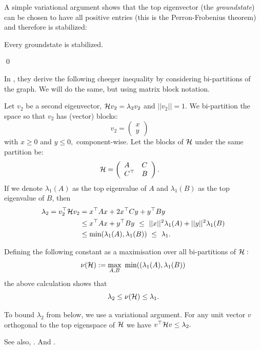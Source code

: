 \documentclass[12pt,notitlepage,longbibliography,nofootinbib,tightenlines]{revtex4}
\begin{document}
A simple variational argument
shows that the top eigenvector (the {\it groundstate})
can be chosen to have all positive entries
(this is the Perron-Frobenius theorem)
and therefore is stabilized:

Every groundstate is stabilized.

\qed


In \cite{Friedland2002}, they derive the following cheeger inequality
by considering bi-partitions of the graph. We will do the
same, but using matrix block notation.

Let $v_2$ be a second eigenvector, $ \mathcal{H} v_2 = \lambda_2 v_2 $ 
and $||v_2||=1$.
We bi-partition the space 
so that $v_2$ has (vector) blocks:
$$
v_2 = \left( \begin{array}{l}
x\\
y\end{array} \right)\quad
$$
with $x\ge 0$ and $y\le 0,$ component-wise.
Let the blocks of $\mathcal{H}$ under the same partition be:
$$
\mathcal{H} = \left( \begin{array}{ll}
A&C\\
C^\top&B\end{array} \right).\quad
$$
If we denote $\lambda_1(A)$ as the top eigenvalue of $A$ and
$\lambda_1(B)$ as the top eigenvalue of $B$,
then
\begin{align*}
\lambda_2 = v_2^\top \mathcal{H} v_2 &= x^\top A x + 2 x^\top C y + y^\top B y \\
        &\le x^\top A x + y^\top B y\ \le\ ||x||^2 \lambda_1(A) + ||y||^2 \lambda_1(B) \\
        &\le \mbox{min}(\lambda_1(A), \lambda_1(B))\ \le\ \lambda_1.
\end{align*}

Defining the following constant as a maximisation over
all bi-partitions of $\mathcal{H}:$
$$
    \nu(\Ham) := \max_{A, B}\ \mbox{min}((\lambda_1(A), \lambda_1(B))
$$
the above calculation shows that
$$
    \lambda_2 \le \nu(\mathcal{H}) \le \lambda_1.
$$

To bound $\lambda_2$ from below, we use a variational argument.
For any unit vector $v$ orthogonal to the top eigenspace of $\mathcal{H}$ we
have $v^\top \mathcal{H} v \le \lambda_2.$


See also,
\cite{AlShimary2010}.
And \cite{Jarret2015}.

%

\end{document}
